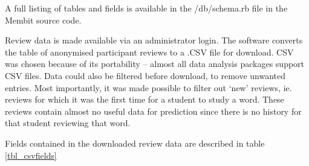 A full listing of tables and fields is available in the /db/schema.rb file in the Membit source code.


Review data is made available via an administrator login. The software converts the
table of anonymised participant reviews to a .CSV file for download. CSV was chosen because of its portability --
almost all data analysis packages support CSV files. Data could also be filtered before download, 
to remove unwanted entries. Most importantly, it was made possible to filter out `new' reviews, ie.
reviews for which it was the first time for a student to study a word. These reviews contain almost
no useful data for prediction since there is no history for that student reviewing that word.

Fields contained in the downloaded review data are described in table \ref{tbl_csvfields}

